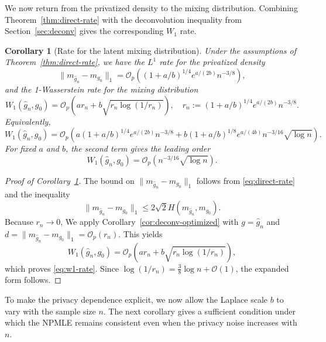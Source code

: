 \documentclass[english, 11pt]{article}
\theoremstyle{plain}
\newtheorem{corollary}[theorem]{Corollary}
\theoremstyle{definition}
\theoremstyle{remark}
\begin{document}
We now return from the privatized density to the mixing distribution.
Combining Theorem~\ref{thm:direct-rate} with the deconvolution inequality from Section~\ref{sec:deconv} gives the corresponding $W_1$ rate.

\begin{corollary}[Rate for the latent mixing distribution]\label{cor:w1-rate}
Under the assumptions of Theorem~\ref{thm:direct-rate}, we have the $L^1$ rate for the privatized density
\begin{equation*}
\|m_{\widehat g_n}-m_{g_0}\|_1 = \mathcal O_p\left((1+a/b)^{1/4}e^{a/(2b)}n^{-3/8}\right),
\end{equation*}
and the 1-Wasserstein rate for the mixing distribution
\begin{equation}\label{eq:w1-rate}
W_1(\widehat g_n,g_0) = \mathcal O_p \left( a r_n + b\sqrt{r_n\log(1/r_n)} \right),
\quad r_n:=(1+a/b)^{1/4}e^{a/(2b)}n^{-3/8}.
\end{equation}
Equivalently,
\begin{equation*}
W_1(\widehat g_n,g_0) = \mathcal O_p\left( a(1+a/b)^{1/4}e^{a/(2b)}n^{-3/8} + b(1+a/b)^{1/8}e^{a/(4b)}n^{-3/16}\sqrt{\log n} \right).
\end{equation*}
For fixed $a$ and $b$, the second term gives the leading order
\begin{equation*}
W_1(\widehat g_n,g_0)=\mathcal O_p\left(n^{-3/16}\sqrt{\log n}\right).
\end{equation*}
\end{corollary}

\begin{proof}[Proof of Corollary~\ref{cor:w1-rate}]
The bound on $\|m_{\widehat g_n}-m_{g_0}\|_1$ follows from \eqref{eq:direct-rate} and the inequality
\begin{equation*}
\|m_{\widehat g_n}-m_{g_0}\|_1 \le 2\sqrt{2} H(m_{\widehat g_n} , m_{g_0}).
\end{equation*}
Because $r_n\to0$, We apply Corollary~\ref{cor:deconv-optimized} with $g=\widehat g_n$ and
$d=\|m_{\widehat g_n}-m_{g_0}\|_1=\mathcal O_p(r_n)$.
This yields
\begin{equation*}
W_1(\widehat g_n,g_0) = \mathcal O_p \left( a r_n + b\sqrt{r_n\log(1/r_n)} \right),
\end{equation*}
which proves \eqref{eq:w1-rate}. Since
$\log(1/r_n)=\frac{3}{8}\log n + \mathcal{O}(1)$,
the expanded form follows.
\end{proof}

To make the privacy dependence explicit, we now allow the Laplace scale $b$ to vary with the sample size $n$.
The next corollary gives a sufficient condition under which the NPMLE remains consistent even when the privacy noise increases with $n$.
\end{document}
